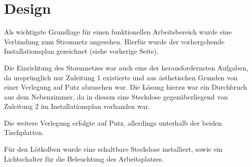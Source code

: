 
\section{Design}

Als wichtigste Grundlage für einen funktionellen Arbeitsbereich wurde eine Verbindung zum Stromnetz angesehen.
Hierfür wurde der vorhergehende Installationsplan gezeichnet (siehe vorherige Seite).

Die Einrichtung des Stormnetzes war auch eine der herausfordernsten Aufgaben, 
da ursprünglich nur Zuleitung 1 existierte und aus ästhetischen Grunden von einer Verlegung auf Putz abzusehen war.
Die Lösung hierzu war ein Durchbruch aus dem Nebenzimmer, da in diesem eine Steckdose gegenüberliegend von Zuleitung 2 im Installationsplan vorhanden war.

Die weitere Verlegung erfolgte auf Putz, allerdings unterhalb der beiden Tischplatten.

 Für den Lötkolben wurde eine schaltbare Steckdose installiert, sowie ein Lichtschalter für die Beleuchtung des Arbeitsplatzes.
